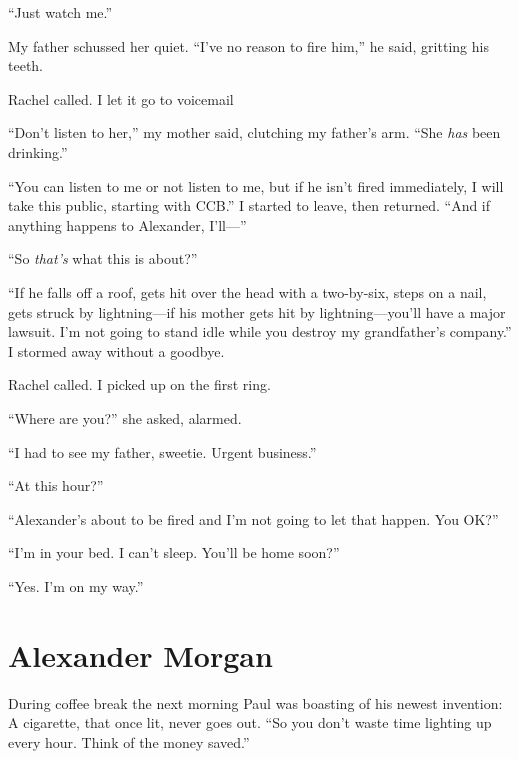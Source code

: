 ``Just watch me.''

My father schussed her quiet. ``I've no reason to fire him,'' he said,
gritting his teeth.

Rachel called. I let it go to voicemail

``Don't listen to her,'' my mother said, clutching my father's arm.
``She \emph{has} been drinking.''

``You can listen to me or not listen to me, but if he isn't fired
immediately, I will take this public, starting with CCB.'' I started to
leave, then returned. ``And if anything happens to Alexander, I'll---''

``So \emph{that's} what this is about?''

``If he falls off a roof, gets hit over the head with a two-by-six,
steps on a nail, gets struck by lightning---if his mother gets hit by
lightning---you'll have a major lawsuit. I'm not going to stand idle
while you destroy my grandfather's company.'' I stormed away without a
goodbye.

Rachel called. I picked up on the first ring.

``Where are you?'' she asked, alarmed.

``I had to see my father, sweetie. Urgent business.''

``At this hour?''

``Alexander's about to be fired and I'm not going to let that happen.
You OK?''

``I'm in your bed. I can't sleep. You'll be home soon?''

``Yes. I'm on my way.''

\chapter{Alexander Morgan}

\titlemark

During coffee break the next morning Paul was boasting of his newest
invention: A cigarette, that once lit, never goes out. ``So you don't
waste time lighting up every hour. Think of the money saved.''


